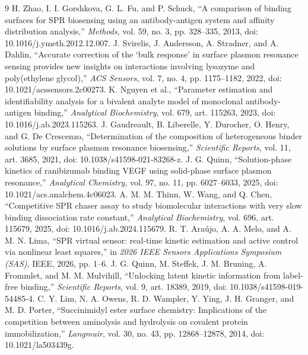 \documentclass[lettersize,journal]{IEEEtran}
\begin{document}
\begin{thebibliography}{9}
 H. Zhao, I. I. Gorshkova, G. L. Fu, and P. Schuck,
``A comparison of binding surfaces for SPR biosensing using an
antibody-antigen system and affinity distribution analysis,''
\emph{Methods}, vol. 59, no. 3, pp. 328--335, 2013,
doi: 10.1016/j.ymeth.2012.12.007.
J. Svirelis, J. Andersson, A. Stradner, and A. Dahlin,
``Accurate correction of the `bulk response' in surface plasmon resonance
sensing provides new insights on interactions involving lysozyme and
poly(ethylene glycol),'' \emph{ACS Sensors}, vol. 7, no. 4,
pp. 1175--1182, 2022, doi: 10.1021/acssensors.2c00273.
K. Nguyen et al., ``Parameter estimation and
identifiability analysis for a bivalent analyte model of monoclonal
antibody-antigen binding,'' \emph{Analytical Biochemistry}, vol. 679,
art. 115263, 2023, doi: 10.1016/j.ab.2023.115263.
 J. Gaudreault, B. Liberelle, Y. Durocher,
O. Henry, and G. De Crescenzo, ``Determination of the composition of
heterogeneous binder solutions by surface plasmon resonance biosensing,''
\emph{Scientific Reports}, vol. 11, art. 3685, 2021,
doi: 10.1038/s41598-021-83268-z.
J. G. Quinn, ``Solution-phase kinetics of ranibizumab
binding VEGF using solid-phase surface plasmon resonance,''
\emph{Analytical Chemistry}, vol. 97, no. 11, pp. 6027--6033, 2025,
doi: 10.1021/acs.analchem.4c06023.
A. M. M. Thinn, W. Wang, and Q. Chen,
``Competitive SPR chaser assay to study biomolecular interactions with very
slow binding dissociation rate constant,'' \emph{Analytical Biochemistry},
vol. 696, art. 115679, 2025, doi: 10.1016/j.ab.2024.115679.
R. T. Ara\'ujo, A. A. Melo, and A. M. N. Lima,
``SPR virtual sensor: real-time kinetic estimation and active control via
nonlinear least squares,'' in \emph{2026 IEEE Sensors Applications
Symposium (SAS)}, IEEE, 2026, pp. 1--6.
J. G. Quinn, M. Steffek, J. M. Bruning, A. Frommlet,
and M. M. Mulvihill, ``Unlocking latent kinetic information from label-free
binding,'' \emph{Scientific Reports}, vol. 9, art. 18389, 2019,
doi: 10.1038/s41598-019-54485-4.
 C. Y. Lim, N. A. Owens, R. D. Wampler, Y. Ying,
J. H. Granger, and M. D. Porter, ``Succinimidyl ester surface chemistry:
Implications of the competition between aminolysis and hydrolysis on
covalent protein immobilization,'' \emph{Langmuir}, vol. 30, no. 43,
pp. 12868--12878, 2014, doi: 10.1021/la503439g.
\end{thebibliography}
\end{document}
